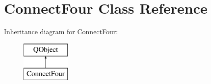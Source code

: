 \hypertarget{class_connect_four}{\section{Connect\-Four Class Reference}
\label{class_connect_four}
}
Inheritance diagram for Connect\-Four\-:\begin{figure}[H]
\begin{center}
\leavevmode
\includegraphics[height=2.000000cm]{class_connect_four}
\end{center}
\end{figure}
